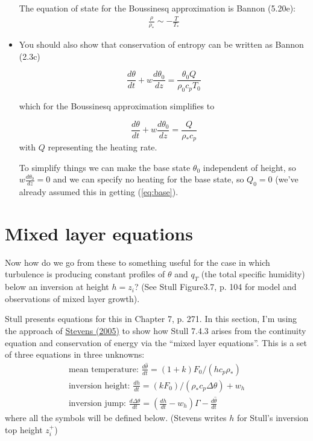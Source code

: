 \documentclass[12pt]{article}
\begin{document}
\begin{itemize}
The equation of state for the Boussinesq approximation is Bannon (5.20e):
\begin{gather}
  \frac{ \rho}{\rho_*}  \sim  - \frac{T }{T_*} 
\end{gather}


\item You should  also show that conservation of entropy can be written
as Bannon (2.3c)

       \begin{equation}
        \label{eq:base}
         \frac{d \theta }{dt}  + w \frac{ d \theta_0}{dz}  = \frac{\theta_0 Q}{\rho_0 c_p T_0} 
       \end{equation}

which for the Boussinesq approximation simplifies to 

       \begin{equation}
         \frac{d \theta }{dt}  + w \frac{ d \theta_0}{dz}  = \frac{ Q}{\rho_* c_p } 
       \end{equation}
with $Q$ representing the heating rate.

To simplify things we can make the base state $\theta_0$ independent of height,
so $w \frac{d \theta_0}{dz} =0$ and we can specify no heating for the base
state, so $Q_0=0$ (we've already assumed this in getting (\ref{eq:base}).

\end{itemize}

\section{Mixed layer equations}
\label{sec:mixed-layer-equat}

Now how do we go from these to something useful for the case in which
turbulence is producing constant profiles of $\theta$ and $q_T$ (the
total specific humidity) below an inversion at height $h=z_i$?  
(See Stull Figure3.7, p. 104 for model and observations of mixed
layer growth).

Stull
presents equations for this in Chapter 7, p. 271.  In this section, I'm using the approach of
\href{http://ezproxy.library.ubc.ca/login?url=http://link.springer.com/10.1007/s00162-006-0032-z}{Stevens (2005)} to show how Stull 7.4.3 arises from
the continuity equation and conservation of energy via
the ``mixed layer equations''. This is a set of
three equations in three unknowns:
\begin{gather}
  \text{mean temperature: } \frac{d \hat{\theta} }{dt} =(1 + k) F_0/(h c_p\rho_*)\label{eq:meantheta}\\
\text{inversion height: } \frac{dh }{dt} = ( k F_0)/(\rho_* c_p \Delta \theta) + w_h \label{eq:hrise}\\
\text{inversion jump: } \frac{d \Delta \theta }{dt} = \left ( \frac{dh }{dt}  - w_h \right ) \Gamma - \frac{d \hat{\theta} }{dt}\label{eq:jump}
\end{gather}
where all the symbols will be defined below. (Stevens writes $h$ for 
Stull's  inversion top height $z_i^+$)
\end{document}
